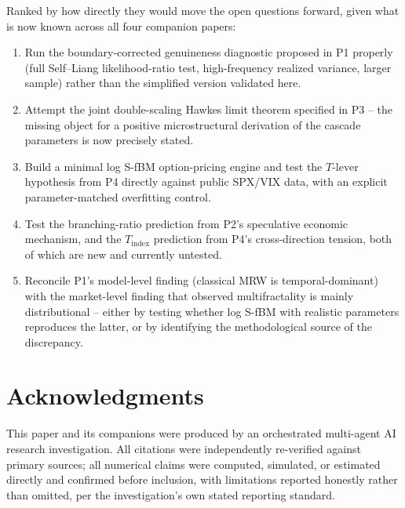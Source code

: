 \documentclass[11pt]{article}
\begin{document}
Ranked by how directly they would move the open questions forward, given what is now known across all four companion papers:
\begin{enumerate}
\item Run the boundary-corrected genuineness diagnostic proposed in P1 properly (full Self--Liang likelihood-ratio test, high-frequency realized variance, larger sample) rather than the simplified version validated here.
\item Attempt the joint double-scaling Hawkes limit theorem specified in P3 -- the missing object for a positive microstructural derivation of the cascade parameters is now precisely stated.
\item Build a minimal log S-fBM option-pricing engine and test the $T$-lever hypothesis from P4 directly against public SPX/VIX data, with an explicit parameter-matched overfitting control.
\item Test the branching-ratio prediction from P2's speculative economic mechanism, and the $T_{\text{index}}$ prediction from P4's cross-direction tension, both of which are new and currently untested.
\item Reconcile P1's model-level finding (classical MRW is temporal-dominant) with the market-level finding that observed multifractality is mainly distributional -- either by testing whether log S-fBM with realistic parameters reproduces the latter, or by identifying the methodological source of the discrepancy.
\end{enumerate}

\section*{Acknowledgments}
This paper and its companions were produced by an orchestrated multi-agent AI research investigation. All citations were independently re-verified against primary sources; all numerical claims were computed, simulated, or estimated directly and confirmed before inclusion, with limitations reported honestly rather than omitted, per the investigation's own stated reporting standard.
\end{document}

